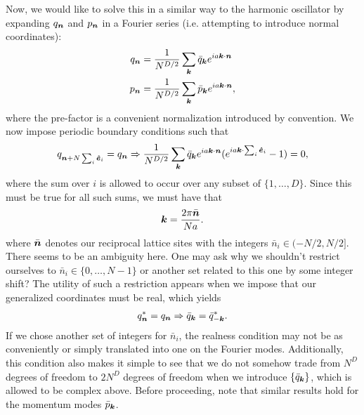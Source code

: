 {Now, we would like to solve this in a similar way to the harmonic oscillator by expanding $q_{\vb*{n}}$ and $p_{\vb*{n}}$ in a Fourier series (i.e. attempting to introduce normal coordinates):
\begin{align}
    q_{\vb*{n}} &= \frac{1}{N^{D/2}} \sum_{\vb*{k}} \bar{q}_{\vb*{k}} e^{i a \vb*{k} \cdot \vb*{n}} \\
    p_{\vb*{n}} &= \frac{1}{N^{D/2}} \sum_{\vb*{k}} \bar{p}_{\vb*{k}} e^{i a \vb*{k} \cdot \vb*{n}}
,\end{align}
where the pre-factor is a convenient normalization introduced by convention.
We now impose periodic boundary conditions such that
\begin{align}
    q_{\vb*{n} + N \sum_{i} \vu*{e}_{i}} = q_{\vb*{n}} \Rightarrow \frac{1}{N^{D/2}} \sum_{\vb*{k}} \bar{q}_{\vb*{k}} e^{ia \vb*{k} \cdot \vb*{n}} ( e^{i a \vb*{k} \cdot \sum_{i} \vu*{e}_{i}} - 1) = 0
,\end{align}
where the sum over $i$ is allowed to occur over any subset of $\{1,\ldots,D\}$.
Since this must be true for all such sums, we must have that
\begin{align}
    \vb*{k} = \frac{2 \pi \bar{\vb*{n}}}{N a}
.\end{align}
where $\bar{\vb*{n}}$ denotes our reciprocal lattice sites with the integers $\bar{n}_{i} \in (-N/2,N/2]$.
There seems to be an ambiguity here. 
One may ask why we shouldn't restrict ourselves to $\bar{n}_{i} \in \{ 0,\ldots,N-1 \}$ or another set related to this one by some integer shift?
The utility of such a restriction appears when we impose that our generalized coordinates must be real, which yields
\begin{align}
    q_{\vb*{n}}^{*} = q_{\vb*{n}} \Rightarrow \bar{q}_{\vb*{k}} = \bar{q}_{-\vb*{k}}^{*}
.\end{align}
If we chose another set of integers for $\bar{n}_{i}$, the realness condition may not be as conveniently or simply translated into one on the Fourier modes.
Additionally, this condition also makes it simple to see that we do not somehow trade from $N^{D}$ degrees of freedom to $2 N^{D}$ degrees of freedom when we introduce $\{ \bar{q}_{\vb*{k}} \}$, which is allowed to be complex above.
Before proceeding, note that similar results hold for the momentum modes $\bar{p}_{\vb*{k}}$.

}
